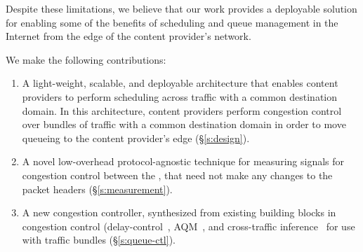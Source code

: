 
Despite these limitations, we believe that our work provides a deployable solution for enabling some of the benefits of scheduling and queue management in the Internet from the edge of the content provider's network.
 \fi
 
We make the following contributions:
\begin{enumerate}
    \item A light-weight, scalable, and deployable architecture that enables content providers to perform scheduling across traffic with a common destination domain. In this architecture, content providers perform congestion control over bundles of traffic with a common destination domain in order to move queueing to the content provider's edge (\S\ref{s:design}).
     \item A novel low-overhead protocol-agnostic technique for measuring signals for congestion control between the \pair, that need not make any changes to the packet headers (\S\ref{s:measurement}).
     \item A new congestion controller, synthesized from existing building blocks in congestion control (delay-control~\cite{copa}, AQM~\cite{pie}, and cross-traffic inference~\cite{nimbus} for use with traffic bundles (\S\ref{s:queue-ctl}).
\end{enumerate}
\fi
